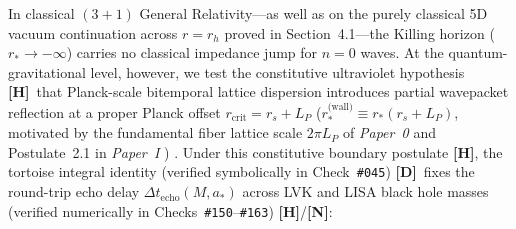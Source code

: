 \documentclass[11pt,a4paper]{article}
\newcommand{\catD}{\textbf{\textcolor{blue!75!black}{[D]}}}
\newcommand{\catH}{\textbf{\textcolor{orange!85!black}{[H]}}}
\newcommand{\catN}{\textbf{\textcolor{teal!75!black}{[N]}}}
\theoremstyle{plain}
\theoremstyle{definition}
\theoremstyle{remark}
\numberwithin{equation}{section}
\begin{document}
In classical $(3+1)$ General Relativity---as well as on the purely classical 5D vacuum continuation across $r = r_h$ proved in Section~4.1---the Killing horizon ($r_* \to -\infty$) carries no classical impedance jump for $n = 0$ waves. At the quantum-gravitational level, however, we test the constitutive ultraviolet hypothesis \catH\ that Planck-scale bitemporal lattice dispersion introduces partial wavepacket reflection at a proper Planck offset $r_{\text{crit}} = r_s + L_P$ ($r_*^{\text{(wall)}} \equiv r_*(r_s + L_P)$, motivated by the fundamental fiber lattice scale $2\pi L_P$ of \textit{Paper~0} \cite{jimenez2026_p0} and Postulate~2.1 in \textit{Paper~I} \cite{jimenez2026a}) \cite{cardoso2016,abedi2017,cardoso2019}. Under this constitutive boundary postulate \catH, the tortoise integral identity (verified symbolically in Check~\texttt{\#045}) \catD\ fixes the round-trip echo delay $\Delta t_{\text{echo}}(M, a_*)$ across LVK and LISA black hole masses (verified numerically in Checks~\texttt{\#150}--\texttt{\#163}) \catH/\catN:
\end{document}

